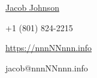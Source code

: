 \documentclass[letterpaper,11pt]{article}
\begin{document}
\begin{center}
    \href{{https://scholar.google.com/citations?user=CIF4P1MAAAAJ}}{\LARGE Jacob Johnson} \\ \vspace{0pt}
    \begin{multicols}{3}
    
    \begin{flushleft}
    \large{+1 (801) 824-2215} \\
    \end{flushleft}

    \begin{center}
    \href{{https://nnnNNnnn.info}}{\large{https://nnnNNnnn.info}} \\
    \end{center}
    
    \begin{flushright}
    \href{mailto:{jacob@nnnnnnnn.info}} \large{jacob@nnnNNnnn.info}
    \end{flushright}
    
    \end{multicols}
\end{center}

\end{document}
